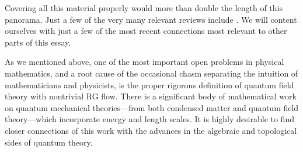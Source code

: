 \documentclass[12pt]{article}
\begin{document}
Covering all this material properly would more than double the length of 
this panorama. Just a few of the very many relevant reviews include 
\cite{Mermin:1979zz,Shapere:1989kp,Fradkin:2013sab,Stone:1992ft,Hasan:2010xy,Qi:2010qag,bernevig2013topological,Frohlich:2018cdi,Rowell:2018wnv,Tong:2016kpv,Brauner:2022rvf,McGreevy:2022oyu}.
We will content ourselves with just a 
few of the most recent connections most relevant 
to other parts of this essay. 


As we mentioned above, one of the most important open problems in physical mathematics,
and a root cause of the occasional chasm separating the intuition
of mathematicians and physicists, is the proper rigorous definition
of quantum field theory with nontrivial RG flow.
There is a significant body of mathematical work on quantum mechanical theories---from both condensed matter and quantum field theory---which incorporate energy and length scales.  It is highly desirable to find closer connections of this work with the advances in the algebraic and topological sides of quantum theory. 
\end{document}
